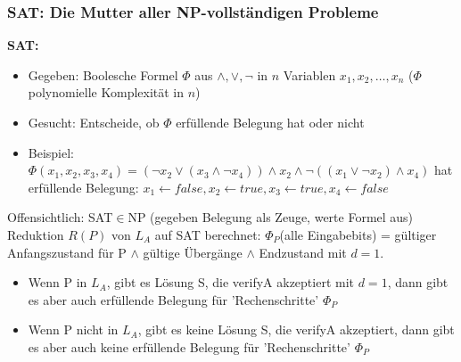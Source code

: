 \documentclass{article}
\begin{document}
            \subsubsection{SAT: Die Mutter aller NP-vollständigen Probleme}
                \textbf{SAT:}
                \begin{itemize}
                    \item Gegeben: Boolesche Formel $\Phi$ aus $\wedge ,\vee ,\lnot$ in $n$ Variablen $x_1,x_2,\dots ,x_n$ ($\Phi$ polynomielle Komplexität in $n$)
                    \item Gesucht: Entscheide, ob $\Phi$ erfüllende Belegung hat oder nicht
                    \item Beispiel: $\Phi(x_1,x_2,x_3,x_4)=(\lnot x_2 \vee (x_3 \wedge \lnot x_4))\wedge x_2 \wedge \lnot ((x_1 \vee \lnot x_2)\wedge x_4)$ hat erfüllende Belegung: $x_1 \leftarrow false, x_2 \leftarrow true, x_3 \leftarrow true, x_4\leftarrow false$
                \end{itemize}
                Offensichtlich: SAT$\in$NP (gegeben Belegung als Zeuge, werte Formel aus)\\
                
                Reduktion $R(P)$ von $L_A$ auf SAT berechnet:
                $\Phi_P$(alle Eingabebits) = gültiger Anfangszustand für P $\wedge$ gültige Übergänge $\wedge$ Endzustand mit $d=1$.\\
                \begin{itemize}
                    \item Wenn P in $L_A$, gibt es Lösung S, die verifyA akzeptiert mit $d=1$, dann gibt es aber auch erfüllende Belegung für 'Rechenschritte' $\Phi_P$
                    \item Wenn P nicht in $L_A$, gibt es keine Lösung S, die verifyA akzeptiert, dann gibt es aber auch keine erfüllende Belegung für 'Rechenschritte' $\Phi_P$
                \end{itemize}
\end{document}

